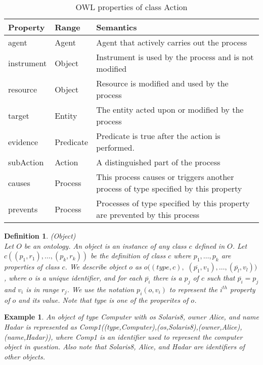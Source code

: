 \documentclass[12pt,journal,letterpaper,onecolumn]{IEEEtran}
\newtheorem{definition}{Definition}[section]
\newtheorem{example}{Example}[section]
\begin{document}
\begin{table}[h]
\begin{center}
\begin{minipage}{5in}
\footnotesize
\begin{tabular}{|l|l|p{3in}|}
\hline
Property & Range & Semantics \\
\hline
agent & Agent & Agent that actively carries out the process\\
instrument & Object & Instrument is used by the process and is not modified\\
resource & Object & Resource is modified and used by the process\\
target & Entity & The entity acted upon or modified by the process\\
evidence & Predicate & Predicate is true after the action is performed. \\
subAction & Action & A distinguished part of the process \\
causes & Process & This process causes or triggers another process of type specified by this property\\
prevents & Process &  Processes of type specified by this property are prevented by this process \\
\hline
\end{tabular}
\normalsize
\end{minipage}
\caption{OWL properties of class Action} \label{table:action}
\end{center}
\end{table}



\begin{definition}(Object)\\
Let $O$ be an ontology. An object is an instance of any class $c$
defined in $O$. Let $c((p_1,r_1),\ldots,(p_k,r_k))$ be the
definition of class $c$ where $p_1,\ldots, p_k$ are properties
of class $c$. We describe object $o$ as
$o((type,c),$ $(\overline{p_1},v_1),\ldots,(\overline{p_l},v_l))$,
where $o$ is a unique identifier, and for each $\overline{p_i}$
there is a $p_j$ of $c$ such that $\overline{p_i}=p_j$
and $v_i$ is in range $r_j$. We use the notation
$p_i(o,v_i)$ to represent the $i^{th}$ property of $o$ and
its value. Note that {\ttfamily type} is one of the properites
of $o$. \label{def:object}
\end{definition}

\begin{example} An object of type {\ttfamily Computer} with
os {\ttfamily Solaris8}, owner {\ttfamily Alice}, and name
{\ttfamily Hadar} is represented as {\ttfamily
Comp1((type,Computer),(os,Solaris8)},{\ttfamily(owner,Alice)}, {\ttfamily(name,Hadar))},
where {\ttfamily Comp1} is an identifier used to represent the
computer object in question. Also note that {\ttfamily Solaris8},
{\ttfamily Alice}, and {\ttfamily Hadar} are identifiers of other
objects. \label{eg:object}
\end{example}
\end{document}
